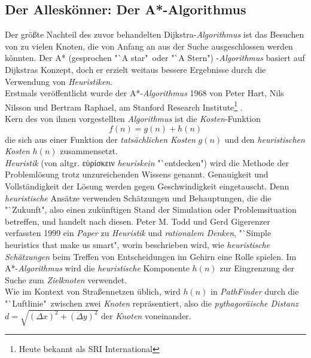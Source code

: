\documentclass[12pt]{article}
\begin{document}
\subsection{Der Alleskönner: Der A*-Algorithmus}
Der größte Nachteil des zuvor behandelten Dijkstra-\textit{Algorithmus} ist das Besuchen von zu vielen Knoten, die von Anfang an aus der Suche ausgeschlossen werden könnten. Der A* (gesprochen "`A star"\ oder "`A Stern") -\textit{Algorithmus} basiert auf Dijkstras Konzept, doch er erzielt weitaus bessere Ergebnisse durch die Verwendung von \textit{Heuristiken}.
\\
Erstmals veröffentlicht wurde der A*-\textit{Algorithmus} 1968 von Peter Hart, Nils Nilsson und Bertram Raphael, am Stanford Research Institute\footnote{Heute bekannt als SRI International} \cite{astar}.
\\
Kern des von ihnen vorgestellten \textit{Algorithmus} ist die \textit{Kosten}-Funktion
\[
f(n) = g(n) + h(n)
\]
die sich aus einer Funktion der \textit{tatsächlichen Kosten} $g(n)$ und den \textit{heuristischen Kosten} $h(n)$ zusammensetzt.
\\
\textit{Heuristik} (von altgr. \textgreek{εὑρίσκειν} \textit{heuriskein} "`entdecken") wird die Methode der Problemlösung trotz unzureichenden Wissens genannt. Genauigkeit und Vollständigkeit der Lösung werden gegen Geschwindigkeit eingetauscht. Denn \textit{heuristische} Ansätze verwenden Schätzungen und Behauptungen, die die "`Zukunft", also einen zukünftigen Stand der Simulation oder Problemsituation betreffen, und handelt nach diesen. Peter M. Todd und Gerd Gigerenzer verfassten 1999 ein \textit{Paper} zu \textit{Heuristik} und \textit{rationalem Denken}, "`Simple heuristics that make us smart"\cite{heuristics}, worin beschrieben wird, wie \textit{heuristische Schätzungen} beim Treffen von Entscheidungen im Gehirn eine Rolle spielen. Im A*-\textit{Algorithmus} wird die \textit{heuristische} Komponente $h(n)$ zur Eingrenzung der Suche zum \textit{Zielknoten} verwendet. 
\\
Wie im Kontext von Straßennetzen üblich, wird $h(n)$ in \textit{PathFinder} durch die "`Luftlinie"\ zwischen zwei \textit{Knoten} repräsentiert, also die \textit{pythagoräische Distanz} $d = \sqrt{(\Delta x)^2 + (\Delta y)^2}$ der \textit{Knoten} voneinander.
\label{sec:astar}
\end{document}
